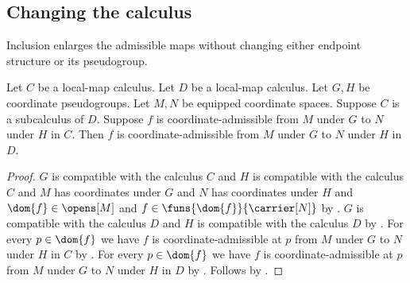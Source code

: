 \subsection{Changing the calculus}

Inclusion enlarges the admissible maps without changing either endpoint
structure or its pseudogroup.

\begin{theorem}\label{coordinate_admissible_subcalculus}
    Let $C$ be a local-map calculus.
    Let $D$ be a local-map calculus.
    Let $G,H$ be coordinate pseudogroups.
    Let $M,N$ be equipped coordinate spaces.
    Suppose $C$ is a subcalculus of $D$.
    Suppose $f$ is coordinate-admissible from $M$ under $G$ to $N$ under $H$ in $C$.
    Then $f$ is coordinate-admissible from $M$ under $G$ to $N$ under $H$ in $D$.
\end{theorem}
\begin{proof}
    $G$ is compatible with the calculus $C$ and $H$ is compatible with the calculus $C$ and
        $M$ has coordinates under $G$ and $N$ has coordinates under $H$ and
        $\dom{f}\in\opens[M]$ and $f\in\funs{\dom{f}}{\carrier[N]}$ by
        .
    $G$ is compatible with the calculus $D$ and $H$ is compatible with the calculus $D$ by
        .
    For every $p\in\dom{f}$ we have
        $f$ is coordinate-admissible at $p$ from $M$ under $G$ to $N$ under $H$ in $C$ by
        .
    For every $p\in\dom{f}$ we have
        $f$ is coordinate-admissible at $p$ from $M$ under $G$ to $N$ under $H$ in $D$ by
        .
    Follows by .
\end{proof}

